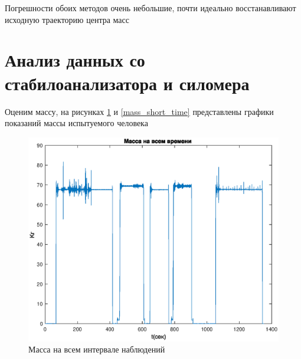 \documentclass[a4paper,12pt, openany]{book}
\theoremstyle{plain} %
\theoremstyle{definition} %
\theoremstyle{remark} %
\numberwithin{equation}{chapter}
\begin{document}
{

Погрешности обоих методов очень небольшие, почти идеально восстанавливают исходную траекторию центра масс

\section{Анализ данных со стабилоанализатора и силомера}

Оценим массу, на рисунках \ref{mass_full_time} и
\ref{mass_short_time} представлены графики показаний массы испытуемого человека

\begin{figure}[h!]
    \begin{center}
        \begin{minipage}[h]{0.46\linewidth}
            \includegraphics[width=1\linewidth]{mass_full_time.eps}
            \caption{Масса на всем интервале наблюдений}
            \label{mass_full_time}
        \end{minipage}
        \hfill
        \begin{minipage}[h]{0.46\linewidth}

\end{minipage}
\end{center}
\end{figure}}
\end{document}
